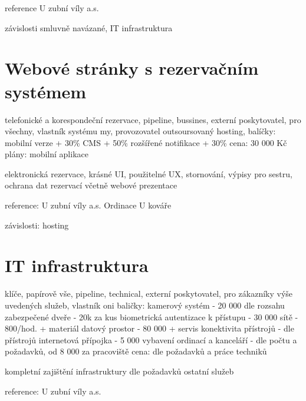 \documentclass[12pt, a4paper, titlepage]{article}
\begin{document}
	reference
		U zubní víly a.s.


	závislosti
		smluvně navázané, IT infrastruktura

	\section{Webové stránky s rezervačním systémem}
	telefonické a korespondeční rezervace, pipeline, bussines, externí poskytovatel, pro všechny,
	vlastník systému my, provozovatel outsoursovaný hosting, 
	balíčky:
		mobilní verze + 30\%
		CMS + 50\% 
		rozšířené notifikace + 30\%
	cena:
		30 000 Kč
	plány:
		mobilní aplikace

	elektronická rezervace, krásné UI, použitelné UX, stornování, výpisy pro sestru, ochrana dat rezervací
	včetně webové prezentace

	reference:
		U zubní víly a.s.
		Ordinace U kováře

	závislosti:
		hosting

	\section{IT infrastruktura}
	klíče, papírově vše, pipeline, technical, externí poskytovatel, pro zákazníky výše uvedených služeb,
	vlastník oni
	baličky:
		kamerový systém - 20 000 dle rozsahu
		zabezpečené dveře - 20k za kus
		biometrická autentizace k přístupu - 30 000
		sítě - 800/hod. + materiál
		datový prostor - 80 000 + servis
		konektivita přístrojů - dle přístrojů
		internetová přípojka - 5 000
		vybavení ordinací a kanceláří - dle počtu a požadavků, od 8 000 za pracoviště
	cena:
		dle požadavků a práce techniků

	kompletní zajištění infrastruktury dle požadavků ostatní služeb

	reference:
		U zubní víly a.s.
\end{document}
